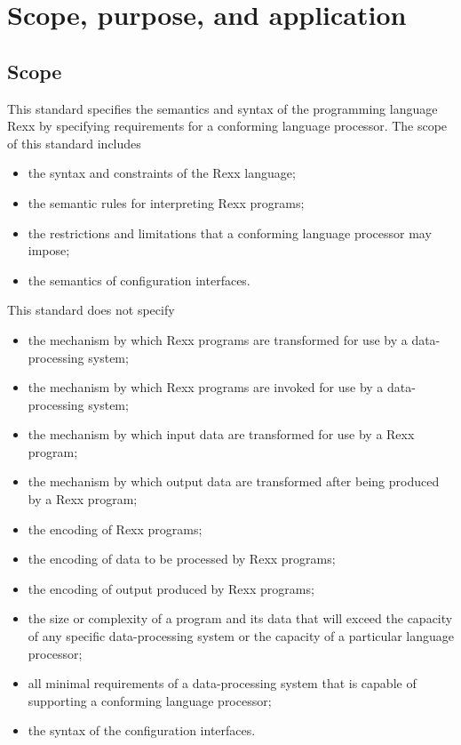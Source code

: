 \chapter{Scope, purpose, and
application}\label{scope-purpose-and-application}

\section{Scope}\label{scope}

This standard specifies the semantics and syntax of the programming
language Rexx by specifying requirements for a conforming language
processor. The scope of this standard includes

\begin{itemize}
\item
  the syntax and constraints of the Rexx language;
\item
  the semantic rules for interpreting Rexx programs;
\item
  the restrictions and limitations that a conforming language processor
  may impose;
\item
  the semantics of configuration interfaces.
\end{itemize}

This standard does not specify

\begin{itemize}
\item
  the mechanism by which Rexx programs are transformed for use by a
  data-processing system;
\item
  the mechanism by which Rexx programs are invoked for use by a
  data-processing system;
\item
  the mechanism by which input data are transformed for use by a Rexx
  program;
\item
  the mechanism by which output data are transformed after being
  produced by a Rexx program;
\item
  the encoding of Rexx programs;
\item
  the encoding of data to be processed by Rexx programs;
\item
  the encoding of output produced by Rexx programs;
\item
  the size or complexity of a program and its data that will exceed the
  capacity of any specific data-processing system or the capacity of a
  particular language processor;
\item
  all minimal requirements of a data-processing system that is capable
  of supporting a conforming language processor;
\item
  the syntax of the configuration interfaces.
\end{itemize}

